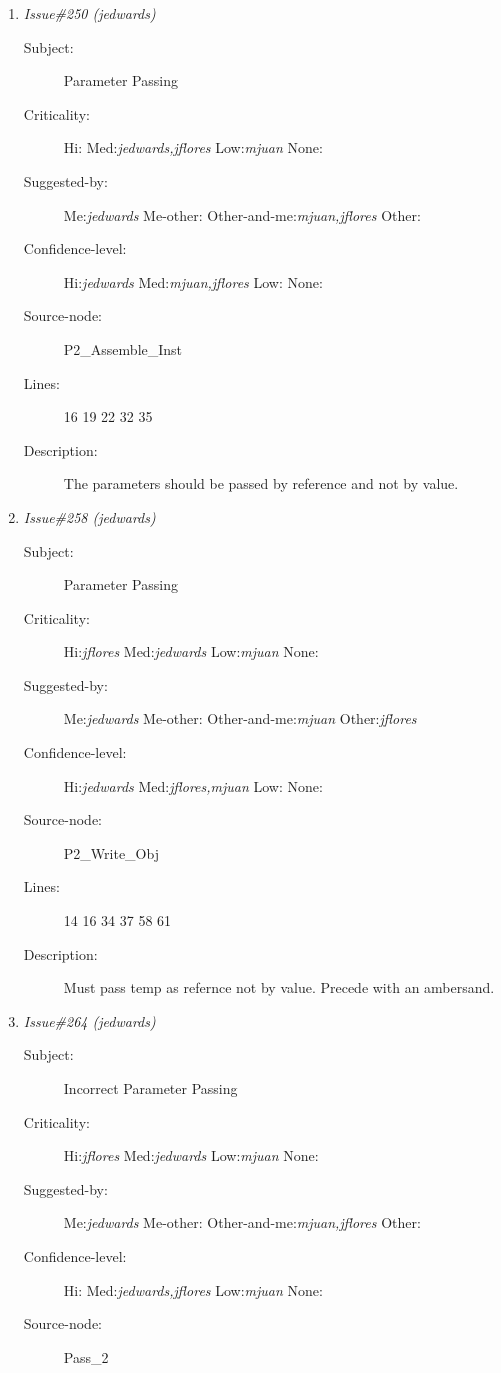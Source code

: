 \begin{enumerate}
\begin{description}
\item [Lines:] 35

\item [Description:] i is not re-initialized before being used in
the else while loop.
\end{description}
\item {\it Issue\#250 (jedwards)}
\begin{description}
\item [Subject:] Parameter Passing
\item [Criticality:] Hi:{\it } Med:{\it jedwards,jflores} Low:{\it mjuan} None:{\it }
\item [Suggested-by:] Me:{\it jedwards} Me-other:{\it } Other-and-me:{\it mjuan,jflores} Other:{\it }
\item [Confidence-level:] Hi:{\it jedwards} Med:{\it mjuan,jflores} Low:{\it } None:{\it }
\item [Source-node:] P2\_Assemble\_Inst

\item [Lines:] 16 19 22 32 35

\item [Description:] The parameters should be passed by reference
and not by value.
\end{description}
\item {\it Issue\#258 (jedwards)}
\begin{description}
\item [Subject:] Parameter Passing
\item [Criticality:] Hi:{\it jflores} Med:{\it jedwards} Low:{\it mjuan} None:{\it }
\item [Suggested-by:] Me:{\it jedwards} Me-other:{\it } Other-and-me:{\it mjuan} Other:{\it jflores}
\item [Confidence-level:] Hi:{\it jedwards} Med:{\it jflores,mjuan} Low:{\it } None:{\it }
\item [Source-node:] P2\_Write\_Obj

\item [Lines:] 14 16 34 37 58 61

\item [Description:] Must pass temp as refernce not by value.
Precede with an ambersand.
\end{description}
\item {\it Issue\#264 (jedwards)}
\begin{description}
\item [Subject:] Incorrect Parameter Passing
\item [Criticality:] Hi:{\it jflores} Med:{\it jedwards} Low:{\it mjuan} None:{\it }
\item [Suggested-by:] Me:{\it jedwards} Me-other:{\it } Other-and-me:{\it mjuan,jflores} Other:{\it }
\item [Confidence-level:] Hi:{\it } Med:{\it jedwards,jflores} Low:{\it mjuan} None:{\it }
\item [Source-node:] Pass\_2


\end{description}
\end{enumerate}
